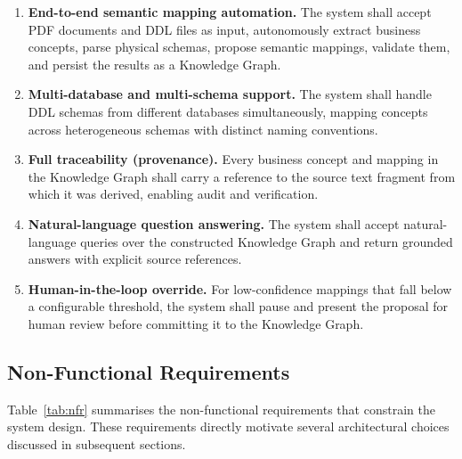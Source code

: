 \begin{enumerate}
    \item \textbf{End-to-end semantic mapping automation.} The system shall accept PDF documents and DDL files as input, autonomously extract business concepts, parse physical schemas, propose semantic mappings, validate them, and persist the results as a Knowledge Graph.

    \item \textbf{Multi-database and multi-schema support.} The system shall handle DDL schemas from different databases simultaneously, mapping concepts across heterogeneous schemas with distinct naming conventions.

    \item \textbf{Full traceability (provenance).} Every business concept and mapping in the Knowledge Graph shall carry a reference to the source text fragment from which it was derived, enabling audit and verification.

    \item \textbf{Natural-language question answering.} The system shall accept natural-language queries over the constructed Knowledge Graph and return grounded answers with explicit source references.

    \item \textbf{Human-in-the-loop override.} For low-confidence mappings that fall below a configurable threshold, the system shall pause and present the proposal for human review before committing it to the Knowledge Graph.
\end{enumerate}

\subsection{Non-Functional Requirements}
\label{sec:sd:nonfunctional}

Table~\ref{tab:nfr} summarises the non-functional requirements that constrain the system design. These requirements directly motivate several architectural choices discussed in subsequent sections.

